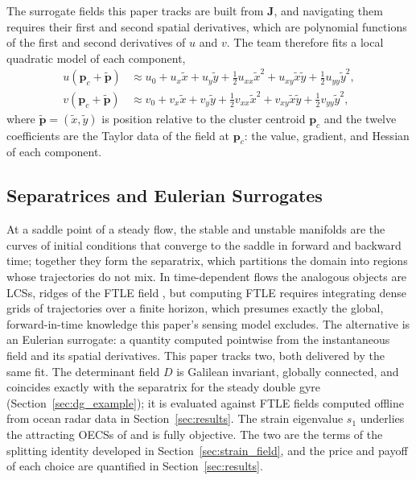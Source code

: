 \documentclass[lettersize,journal]{IEEEtran}
\begin{document}
The surrogate fields this paper tracks are built from $\mathbf{J}$, and
navigating them requires their first and second spatial derivatives,
which are polynomial functions of the first and second derivatives of
$u$ and $v$. The team therefore fits a local quadratic model of each
component,
\begin{align}
    u(\mathbf{p}_c + \tilde{\mathbf{p}}) &\approx u_0 + u_x \tilde{x}
        + u_y \tilde{y} + \tfrac{1}{2} u_{xx} \tilde{x}^2
        + u_{xy} \tilde{x}\tilde{y} + \tfrac{1}{2} u_{yy} \tilde{y}^2,
        \label{eq:quad_model_u} \\
    v(\mathbf{p}_c + \tilde{\mathbf{p}}) &\approx v_0 + v_x \tilde{x}
        + v_y \tilde{y} + \tfrac{1}{2} v_{xx} \tilde{x}^2
        + v_{xy} \tilde{x}\tilde{y} + \tfrac{1}{2} v_{yy} \tilde{y}^2,
        \label{eq:quad_model_v}
\end{align}
where $\tilde{\mathbf{p}} = (\tilde{x}, \tilde{y})$ is position relative to
the cluster centroid $\mathbf{p}_c$ and the twelve coefficients are the
Taylor data of the field at $\mathbf{p}_c$: the value, gradient, and
Hessian of each component. 

\subsection{Separatrices and Eulerian Surrogates}
\label{sec:separatrix}

At a saddle point of a steady flow, the stable and unstable manifolds
are the curves of initial conditions that converge to the saddle in
forward and backward time; together they form the separatrix, which
partitions the domain into regions whose trajectories do not mix. In
time-dependent flows the analogous objects are LCSs, ridges of the FTLE
field \cite{6,7,8}, but computing FTLE requires integrating dense grids
of trajectories over a finite horizon, which presumes exactly the
global, forward-in-time knowledge this paper's sensing model excludes.
The alternative is an Eulerian surrogate: a quantity computed pointwise
from the instantaneous field and its spatial derivatives. This paper
tracks two, both delivered by the same fit. The determinant field $D$
is Galilean invariant, globally connected, and coincides exactly with
the separatrix for the steady double gyre
(Section~\ref{sec:dg_example}); it is evaluated against FTLE fields
computed offline from ocean radar data in Section~\ref{sec:results}.
The strain eigenvalue $s_1$ underlies the attracting OECSs of
\cite{17,18} and is fully objective. The two are the terms of the
splitting identity developed in Section~\ref{sec:strain_field}, and the
price and payoff of each choice are quantified in
Section~\ref{sec:results}.
\end{document}

